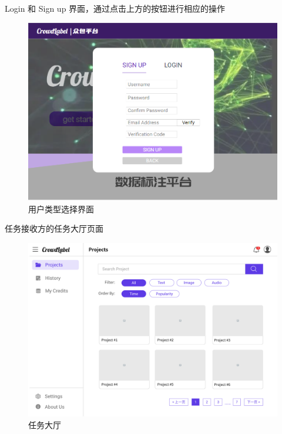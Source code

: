 \newpage

Login 和 Sign up 界面，通过点击上方的按钮进行相应的操作

\begin{figure}[h!]
    \centering
    \includegraphics[width=\linewidth]{imgs/prototype/register.png}
    \caption{用户类型选择界面}
    \label{fig:proto_register}
\end{figure}


\newpage

任务接收方的任务大厅页面

\begin{figure}[h!]
    \centering
    \includegraphics[width=\linewidth]{imgs/prototype/list.png}
    \caption{任务大厅}
    \label{fig:proto_list}
\end{figure}

